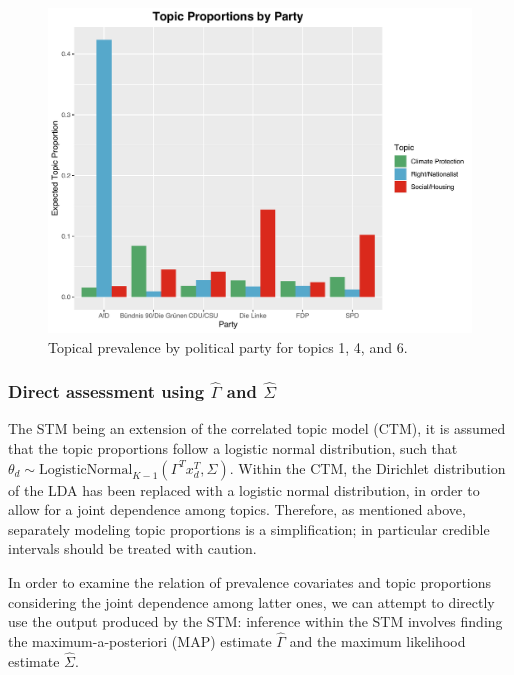 \begin{figure}[h!]
  \centering
  \captionsetup{justification=centering,margin=2cm}
  \includegraphics[scale = 0.5]{../plots/5_1/quasi_t146_cat.pdf}
  \caption{Topical prevalence by political party for topics 1, 4, and 6.}
  \label{fig:quasi_t146_cat}
\end{figure}

\subsubsection{Direct assessment using $\hat{\Gamma}$ and $\hat{\Sigma}$}
\label{Direct assessment}

The STM being an extension of the correlated topic model (CTM), it is assumed that the topic proportions follow a logistic normal distribution, such that $\theta_d \sim \text{LogisticNormal}_{K-1}(\Gamma^Tx_d^T, \Sigma)$. Within the CTM, the Dirichlet distribution of the LDA has been replaced with a logistic normal distribution, in order to allow for a joint dependence among topics. Therefore, as mentioned above, separately modeling topic proportions is a simplification; in particular credible intervals should be treated with caution.

In order to examine the relation of prevalence covariates and topic proportions considering the joint dependence among latter ones, we can attempt to directly use the output produced by the STM: inference within the STM involves finding the maximum-a-posteriori (MAP) estimate $\hat{\Gamma}$ and the maximum likelihood estimate $\hat{\Sigma}$. 

